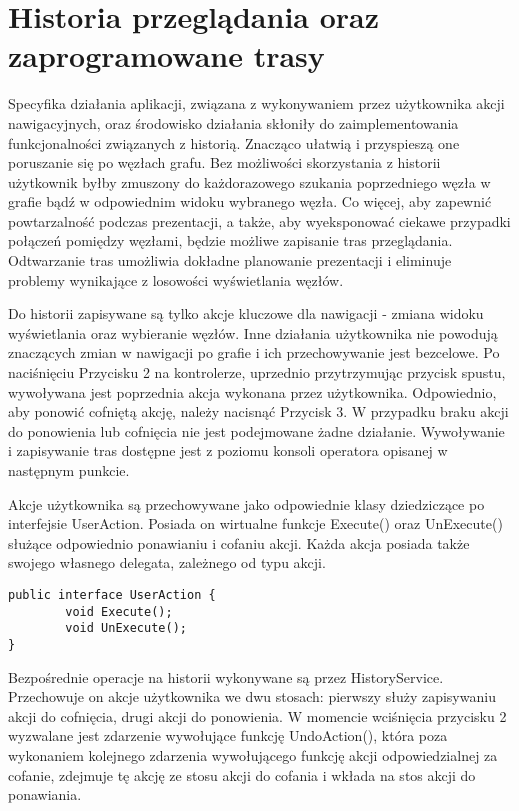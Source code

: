 \section{Historia przeglądania oraz zaprogramowane trasy}
Specyfika działania aplikacji, związana z wykonywaniem przez użytkownika akcji nawigacyjnych, oraz środowisko działania skłoniły do zaimplementowania funkcjonalności związanych z historią. Znacząco ułatwią i przyspieszą one poruszanie się po węzłach grafu. Bez możliwości skorzystania z historii użytkownik byłby zmuszony do każdorazowego szukania poprzedniego węzła  w grafie bądź w odpowiednim widoku wybranego węzła. Co więcej, aby zapewnić powtarzalność podczas prezentacji, a także, aby wyeksponować ciekawe przypadki połączeń pomiędzy węzłami, będzie możliwe zapisanie tras przeglądania. Odtwarzanie tras umożliwia dokładne planowanie prezentacji i eliminuje problemy wynikające z losowości wyświetlania węzłów. 

Do historii zapisywane są tylko akcje kluczowe dla nawigacji - zmiana widoku wyświetlania oraz wybieranie węzłów. Inne działania użytkownika nie powodują znaczących zmian w nawigacji po grafie i ich przechowywanie jest bezcelowe. Po naciśnięciu Przycisku 2 na kontrolerze, uprzednio przytrzymując przycisk spustu, wywoływana jest poprzednia akcja wykonana przez użytkownika. Odpowiednio, aby ponowić cofniętą akcję, należy nacisnąć Przycisk 3. W przypadku braku akcji do ponowienia lub cofnięcia nie jest podejmowane żadne działanie. Wywoływanie i zapisywanie tras dostępne jest z poziomu konsoli operatora opisanej w następnym punkcie.

Akcje użytkownika są przechowywane jako odpowiednie klasy dziedziczące po interfejsie UserAction. Posiada on wirtualne funkcje Execute() oraz UnExecute() służące odpowiednio ponawianiu i cofaniu akcji. Każda akcja posiada także swojego własnego delegata, zależnego od typu akcji. 

\begin{lstlisting}[caption={Interfejs UserAction}, label=lst:IUserAction]
public interface UserAction {
		void Execute();
		void UnExecute();
}
\end{lstlisting}


Bezpośrednie operacje na historii wykonywane są przez HistoryService. Przechowuje on akcje użytkownika we dwu stosach: pierwszy służy zapisywaniu akcji do cofnięcia, drugi akcji do ponowienia. W momencie wciśnięcia przycisku 2 wyzwalane jest zdarzenie wywołujące funkcję UndoAction(), która poza wykonaniem kolejnego zdarzenia wywołującego funkcję akcji odpowiedzialnej za cofanie, zdejmuje tę akcję ze stosu akcji do cofania i wkłada na stos akcji do ponawiania.

